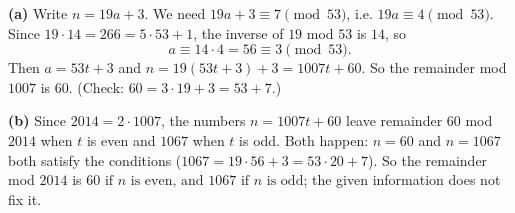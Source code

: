 \textbf{(a)} Write $n=19a+3$. We need $19a+3\equiv7\pmod{53}$, i.e. $19a\equiv4\pmod{53}$. Since $19\cdot14=266=5\cdot53+1$, the inverse of $19$ mod $53$ is $14$, so
\[a\equiv14\cdot4=56\equiv3\pmod{53}.\]
Then $a=53t+3$ and $n=19(53t+3)+3=1007t+60$. So the remainder mod $1007$ is $\boxed{60}$. (Check: $60=3\cdot19+3=53+7$.)

\textbf{(b)} Since $2014=2\cdot1007$, the numbers $n=1007t+60$ leave remainder $60$ mod $2014$ when $t$ is even and $1067$ when $t$ is odd. Both happen: $n=60$ and $n=1067$ both satisfy the conditions ($1067=19\cdot56+3=53\cdot20+7$). So the remainder mod $2014$ is $\boxed{60\text{ if }n\text{ is even, and }1067\text{ if }n\text{ is odd}}$; the given information does not fix it.
